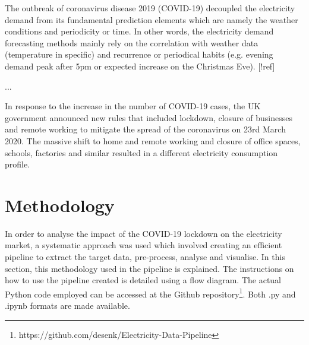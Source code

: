 \documentclass[energies,article,submit,moreauthors,pdftex]{Definitions/mdpi}
\begin{document}

The outbreak of coronavirus disease 2019 (COVID-19) decoupled the electricity demand from its fundamental prediction elements which are namely the weather conditions and periodicity or time. In other words, the electricity demand forecasting methods mainly rely on the correlation with weather data (temperature in specific) and recurrence or periodical habits (e.g. evening demand peak after 5pm or expected increase on the Christmas Eve). [!ref]

...


 In response to the increase in the number of COVID-19 cases, the UK government announced new rules that included lockdown, closure of businesses and remote working to mitigate the spread of the coronavirus on 23rd March 2020. The massive shift to home and remote working and closure of office spaces, schools, factories and similar resulted in a different electricity consumption profile.



 
\section{Methodology\label{section:Methodology}}
In order to analyse the impact of the COVID-19 lockdown on the electricity market, a systematic approach was used which involved creating an efficient pipeline to extract the target data, pre-process, analyse and visualise. In this section, this methodology used in the pipeline is explained. The instructions on how to use the pipeline created is detailed using a flow diagram. The actual Python code employed can be accessed at the Github repository\footnote{https://github.com/desenk/Electricity-Data-Pipeline}. Both .py and .ipynb formats are made available.
\end{document}
